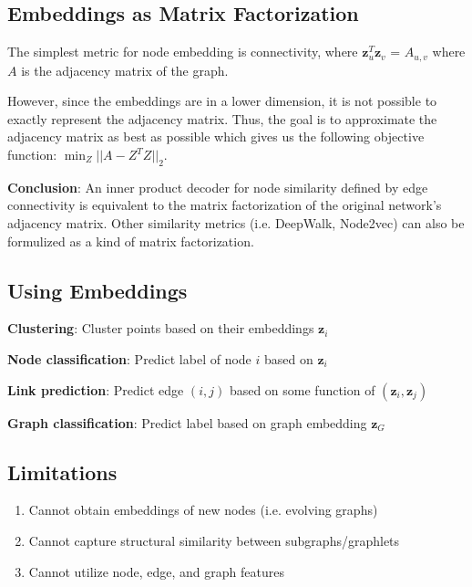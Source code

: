 \documentclass[12pt]{article}
\begin{document}
\subsection*{Embeddings as Matrix Factorization}

The simplest metric for node embedding is connectivity, where
$\mathbf{z}_u^T \mathbf{z}_v$ = $A_{u,v}$ where $A$ is the adjacency matrix of
the graph.

However, since the embeddings are in a lower dimension, it is not possible to
exactly represent the adjacency matrix. Thus, the goal is to approximate
the adjacency matrix as best as possible which gives us the following objective
function: $\min_Z ||A-Z^T Z||_2$.

\medskip
\textbf{Conclusion}: An inner product decoder for node similarity defined by
edge connectivity is equivalent to the matrix factorization of the original
network's adjacency matrix. Other similarity metrics (i.e. DeepWalk, Node2vec)
can also be formulized as a kind of matrix factorization.

\subsection*{Using Embeddings}

\textbf{Clustering}: Cluster points based on their embeddings $\mathbf{z}_i$ 

\textbf{Node classification}: Predict label of node $i$ based on $\mathbf{z}_i$

\textbf{Link prediction}: Predict edge $(i, j)$ based on some function of
$(\mathbf{z}_i, \mathbf{z}_j)$ 

\textbf{Graph classification}: Predict label based on graph embedding $\mathbf{z}_G$

\subsection*{Limitations}

\begin{enumerate}
  \item Cannot obtain embeddings of new nodes (i.e. evolving graphs)
  \item Cannot capture structural similarity between subgraphs/graphlets
  \item Cannot utilize node, edge, and graph features
\end{enumerate}
\end{document}
